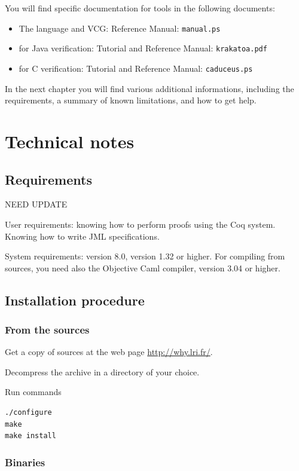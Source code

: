 \documentclass[a4paper,11pt,twoside,openright]{report}
\begin{document}
You will find specific documentation for tools in the following documents:
\begin{itemize}
\item The \Why{} language and VCG: Reference Manual: \texttt{manual.ps} 
\item \Krakatoa{} for Java verification: Tutorial and Reference Manual: \texttt{krakatoa.pdf} 
\item \Caduceus{} for C verification: Tutorial and Reference Manual: \texttt{caduceus.ps} 
\end{itemize}


In the next chapter you will find various additional informations,
including the requirements, a summary of known limitations, and how to
get help. 


\chapter{Technical notes}

\section{Requirements}
\label{app:requirements}

NEED UPDATE

User requirements: knowing how to perform proofs using the Coq
system. Knowing how to write JML specifications.

System requirements: \Coq{} version 8.0, \Why{} version 1.32 or higher. For
compiling \Krakatoa{} from sources, you need also the Objective Caml
compiler, version 3.04 or higher.

\section{Installation procedure}

\subsection{From the sources}

Get a copy of sources at the web page \url{http://why.lri.fr/}. 

Decompress the archive in a directory of your choice.

Run commands
\begin{verbatim}
./configure
make
make install
\end{verbatim}

\subsection{Binaries}
\end{document}
